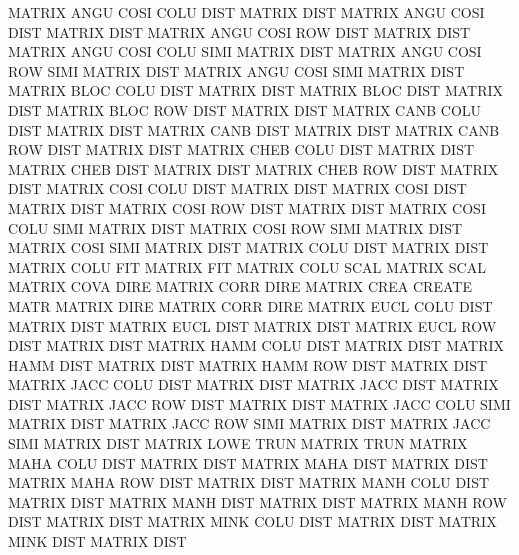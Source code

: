 MATRIX   ANGU COSI COLU DIST            MATRIX   DIST
MATRIX   ANGU COSI DIST                 MATRIX   DIST
MATRIX   ANGU COSI ROW  DIST            MATRIX   DIST
MATRIX   ANGU COSI COLU SIMI            MATRIX   DIST
MATRIX   ANGU COSI ROW  SIMI            MATRIX   DIST
MATRIX   ANGU COSI SIMI                 MATRIX   DIST
MATRIX   BLOC COLU DIST                 MATRIX   DIST
MATRIX   BLOC DIST                      MATRIX   DIST
MATRIX   BLOC ROW  DIST                 MATRIX   DIST
MATRIX   CANB COLU DIST                 MATRIX   DIST
MATRIX   CANB DIST                      MATRIX   DIST
MATRIX   CANB ROW  DIST                 MATRIX   DIST
MATRIX   CHEB COLU DIST                 MATRIX   DIST
MATRIX   CHEB DIST                      MATRIX   DIST
MATRIX   CHEB ROW  DIST                 MATRIX   DIST
MATRIX   COSI COLU DIST                 MATRIX   DIST
MATRIX   COSI DIST                      MATRIX   DIST
MATRIX   COSI ROW  DIST                 MATRIX   DIST
MATRIX   COSI COLU SIMI                 MATRIX   DIST
MATRIX   COSI ROW  SIMI                 MATRIX   DIST
MATRIX   COSI SIMI                      MATRIX   DIST
MATRIX   COLU DIST                      MATRIX   DIST
MATRIX   COLU FIT                       MATRIX   FIT
MATRIX   COLU SCAL                      MATRIX   SCAL
MATRIX   COVA DIRE                      MATRIX   CORR DIRE
MATRIX   CREA                           CREATE   MATR
MATRIX   DIRE                           MATRIX   CORR DIRE
MATRIX   EUCL COLU DIST                 MATRIX   DIST
MATRIX   EUCL DIST                      MATRIX   DIST
MATRIX   EUCL ROW  DIST                 MATRIX   DIST
MATRIX   HAMM COLU DIST                 MATRIX   DIST
MATRIX   HAMM DIST                      MATRIX   DIST
MATRIX   HAMM ROW  DIST                 MATRIX   DIST
MATRIX   JACC COLU DIST                 MATRIX   DIST
MATRIX   JACC DIST                      MATRIX   DIST
MATRIX   JACC ROW  DIST                 MATRIX   DIST
MATRIX   JACC COLU SIMI                 MATRIX   DIST
MATRIX   JACC ROW  SIMI                 MATRIX   DIST
MATRIX   JACC SIMI                      MATRIX   DIST
MATRIX   LOWE TRUN                      MATRIX   TRUN
MATRIX   MAHA COLU DIST                 MATRIX   DIST
MATRIX   MAHA DIST                      MATRIX   DIST
MATRIX   MAHA ROW  DIST                 MATRIX   DIST
MATRIX   MANH COLU DIST                 MATRIX   DIST
MATRIX   MANH DIST                      MATRIX   DIST
MATRIX   MANH ROW  DIST                 MATRIX   DIST
MATRIX   MINK COLU DIST                 MATRIX   DIST
MATRIX   MINK DIST                      MATRIX   DIST

